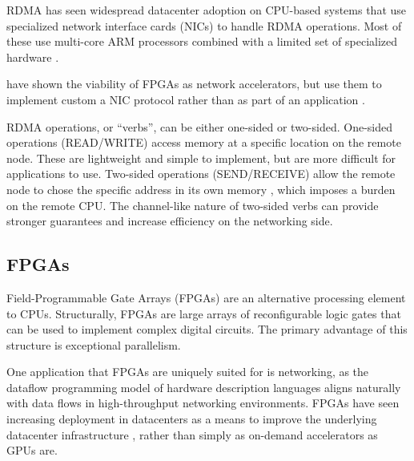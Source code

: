 RDMA has seen widespread datacenter adoption \cite{strom} on CPU-based systems that use specialized network interface cards (NICs) to handle RDMA operations. Most of these use multi-core ARM processors combined with a limited set of specialized hardware \cite{strom}.

\citeauthor{star} have shown the viability of FPGAs as network accelerators, but use them to implement custom a NIC protocol rather than as part of an application \cite{star}.

RDMA operations, or ``verbs'', can be either one-sided or two-sided. One-sided operations (READ/WRITE) access memory at a specific location on the remote node. These are lightweight and simple to implement, but are more difficult for applications to use. Two-sided operations (SEND/RECEIVE) allow the remote node to chose the specific address in its own memory \cite{base}, which imposes a burden on the remote CPU. The channel-like nature of two-sided verbs can provide stronger guarantees and increase efficiency on the networking side.


\subsection{FPGAs}

Field-Programmable Gate Arrays (FPGAs) are an alternative processing element to CPUs. Structurally, FPGAs are large arrays of reconfigurable logic gates that can be used to implement complex digital circuits. The primary advantage of this structure is exceptional parallelism.

One application that FPGAs are uniquely suited for is networking, as the dataflow programming model of hardware description languages aligns naturally with data flows in high-throughput networking environments.
FPGAs have seen increasing deployment in datacenters as a means to improve the underlying datacenter infrastructure \cite{bobda-trets-2022,fang-vldb-2020}, rather than simply as on-demand accelerators as GPUs are.



